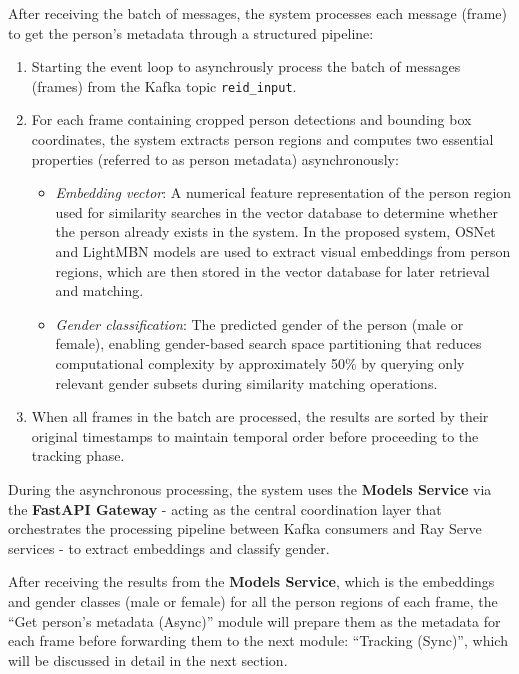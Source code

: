 After receiving the batch of messages, the system processes each message (frame) to get the person's metadata through a structured pipeline:

\begin{enumerate}[label=\quad\textbf{\arabic*.}]
   \item Starting the event loop to asynchrously process the batch of messages (frames) from the Kafka topic \texttt{reid\_input}.
   \item For each frame containing cropped person detections and bounding box coordinates, the system extracts person regions and computes two essential properties (referred to as person metadata) asynchronously:
   \begin{itemize}
       \item \textit{Embedding vector}: A numerical feature representation of the person region used for similarity searches in the vector database to determine whether the person already exists in the system. In the proposed system, OSNet and LightMBN models are used to extract visual embeddings from person regions, which are then stored in the vector database for later retrieval and matching.
       \item \textit{Gender classification}: The predicted gender of the person (male or female), enabling gender-based search space partitioning that reduces computational complexity by approximately 50\% by querying only relevant gender subsets during similarity matching operations.
   \end{itemize}
   \item When all frames in the batch are processed, the results are sorted by their original timestamps to maintain temporal order before proceeding to the tracking phase.
\end{enumerate}

During the asynchronous processing, the system uses the \textbf{Models Service} via the \textbf{FastAPI Gateway} - acting as the central coordination layer that orchestrates the processing pipeline between Kafka consumers and Ray Serve services - to extract embeddings and classify gender.

After receiving the results from the \textbf{Models Service}, which is the embeddings and gender classes (male or female) for all the person regions of each frame, the ``Get person's metadata (Async)'' module will prepare them as the metadata for each frame before forwarding them to the next module: ``Tracking (Sync)'', which will be discussed in detail in the next section.

